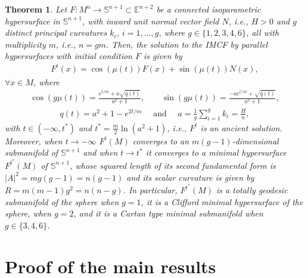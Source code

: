 \documentclass[11pt,a4paper,reqno]{amsproc}
\numberwithin{equation}{section}
\newtheorem{theorem}{\bf Theorem}[section]
\newcommand{\E}{\mathbb{E}}
\begin{document}
\begin{theorem}\label{resgeral}
Let $F: M^{n} \longrightarrow \mathbb{S}^{n+1} \subset \E^{n+2}$ be a connected  isoparametric hypersurface in $\mathbb{S}^{n+1}$, with inward 
unit normal vector field $N$, i.e., $H>0$ and $g$ distinct principal curvatures $k_{i}$, $i=1,\dots,g$, where $g\in\{1,2,3,4,6\}$,  all with multiplicity $m$, i.e.,  $n=gm$.  
Then, the solution to the IMCF by parallel hypersurfaces with initial condition $F$ is given by
\begin{eqnarray}
{F}^{t}(x)=\cos(\mu(t))F(x)+\sin(\mu(t))N(x), \nonumber
\end{eqnarray}
$\forall x \in M$, where
\begin{eqnarray}
\cos(g\mu(t))=\frac{e^{t/m}+a\sqrt{q(t)}}{a^{2}+1},\qquad  \sin(g\mu(t))=\frac{-ae^{t/m}+\sqrt{q(t)}}{a^{2}+1}, \nonumber
\end{eqnarray}
\begin{eqnarray}
q(t)=a^{2}+1-e^{2t/m} \quad  \text{ and } \quad  a=  \frac{1}{g}\sum_{i=1}^g k_{i}=\frac{H}{n}, \nonumber
\end{eqnarray}
with $t \in (-\infty,t^{*})$ and $t^{*}=\frac{m}{2}\ln(a^{2}+1)$, i.e., $ {F}^{t}$ is an ancient solution.  Moreover, when $t\rightarrow -\infty$ 
 $ {F}^{t}(M)$ converges to an  $m(g-1)$-dimensional submanifold of $\mathbb{S}^{n+1}$   and when $t \longrightarrow t^{*}$ it converges to a minimal hypersurface $F^{t^*}(M)$  
of $\mathbb{S}^{n+1}$, whose  squared length  of its second fundamental form is   
$|A|^2= m g(g-1)=n(g-1)$ and its scalar  curvature is given by 
$R=m(m-1)g^2=n(n-g)$. 
In particular,  $F^{t^*}(M)$ is a totally geodesic submanifold of the sphere when $g=1$, it is a Clifford minimal hypersurface of the sphere, when $g=2$, and it is a Cartan type minimal submanifold when $g\in\{3,4,6\}$.       
\end{theorem}
 


\section{Proof of the main results}\label{Proofs}
\end{document}
